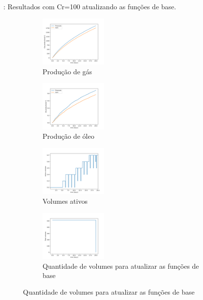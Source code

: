 \documentclass[professionalfont]{beamer}
\begin{document}
\begin{frame}{\FrameProblemName: {\small Resultados com Cr=100 atualizando as funções de base.}}
    \begin{figure}[!ht]
        \centering
        \begin{subfigure}[t]{.48\textwidth}
            \centering
            \includegraphics[height=2.5cm]{./imgs/pr3/cr100/update/svgtopng/gas_prod.png}
            \caption{Produção de gás}
        \end{subfigure}
        \hfill
        \begin{subfigure}[t]{.48\textwidth}
            \centering
            \includegraphics[height=2.5cm]{./imgs/pr3/cr100/update/svgtopng/oil_prod.png}
            \caption{Produção de óleo}
        \end{subfigure}
        \bigskip
        \begin{subfigure}[t]{.48\textwidth}
            \centering
            \includegraphics[height=2.5cm]{./imgs/pr3/cr100/update/svgtopng/volumes_ativos.png}
            \caption{Volumes ativos}
        \end{subfigure}
        \hfill
        \begin{subfigure}[t]{.48\textwidth}
            \centering
            \includegraphics[height=2.5cm]{./imgs/pr3/cr100/update/svgtopng/n_volumes_update.png}
            \caption{Quantidade de volumes para atualizar as funções de base}
        \end{subfigure}
        \label{fig:fig8_pr3-cr100}
        
    \end{figure}
    
\end{frame}
\end{document}
